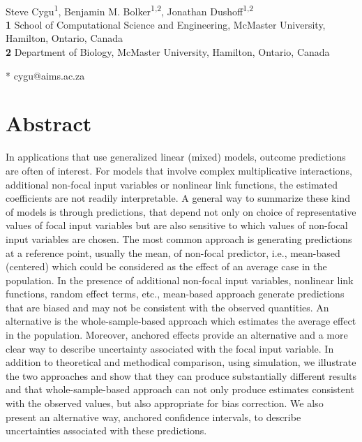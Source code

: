 \begin{flushleft}
{\Large
\textbf{} %
}
\newline
\\
Steve Cygu\textsuperscript{1},
Benjamin M. Bolker\textsuperscript{1,2},
Jonathan Dushoff\textsuperscript{1,2}
\\
\bigskip
\textbf{1} School of Computational Science and Engineering, McMaster University, Hamilton, Ontario, Canada
\\
\textbf{2} Department of Biology, McMaster University, Hamilton, Ontario, Canada
\\
\bigskip


* cygu@aims.ac.za

\end{flushleft}
\section*{Abstract}

In applications that use generalized linear (mixed) models, outcome predictions are often of interest. For models that involve complex multiplicative interactions, additional non-focal input variables or nonlinear link functions, the estimated coefficients are not readily interpretable. A general way to summarize these kind of models is through predictions, that depend not only on choice of representative values of focal input variables but are also sensitive to which values of non-focal input variables are chosen. The most common approach is generating predictions at a reference point, usually the mean, of non-focal predictor, i.e., mean-based (centered) which could be considered as the effect of an average case in the population. In the presence of additional non-focal input variables, nonlinear link functions, random effect terms, etc., mean-based approach generate predictions that are biased and may not be consistent with the observed quantities. An alternative is the whole-sample-based approach which estimates the average effect in the population. Moreover, anchored effects provide an alternative and a more clear way to describe uncertainty associated with the focal input variable. In addition to theoretical and methodical comparison, using simulation, we illustrate the two approaches and show that they can produce substantially different results and that whole-sample-based approach can not only produce estimates consistent with the observed values, but also appropriate for bias correction. We also present an alternative way, anchored confidence intervals, to describe uncertainties associated with these predictions.

